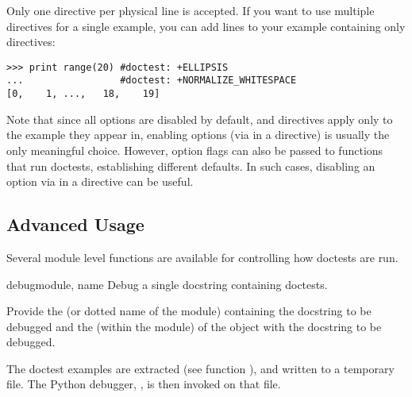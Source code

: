 Only one directive per physical line is accepted.  If you want to
use multiple directives for a single example, you can add
 lines to your example containing only directives:

\begin{verbatim}
>>> print range(20) #doctest: +ELLIPSIS
...                 #doctest: +NORMALIZE_WHITESPACE
[0,    1, ...,   18,    19]
\end{verbatim}

Note that since all options are disabled by default, and directives apply
only to the example they appear in, enabling options (via \code{+} in a
directive) is usually the only meaningful choice.  However, option flags
can also be passed to functions that run doctests, establishing different
defaults.  In such cases, disabling an option via \code{-} in a directive
can be useful.



\subsection{Advanced Usage}

Several module level functions are available for controlling how doctests
are run.

\begin{funcdesc}{debug}{module, name}
  Debug a single docstring containing doctests.

  Provide the  (or dotted name of the module) containing the
  docstring to be debugged and the  (within the module) of the
  object with the docstring to be debugged.

  The doctest examples are extracted (see function ),
  and written to a temporary file.  The Python debugger, ,
  is then invoked on that file.
\end{funcdesc}

